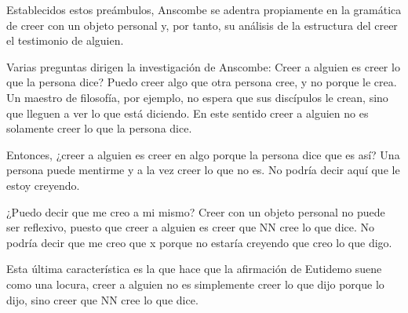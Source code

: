 Establecidos estos preámbulos, Anscombe se adentra propiamente en la gramática
de creer con un objeto personal y, por tanto, su análisis de la estructura del
creer el testimonio de alguien.

Varias preguntas dirigen la investigación de Anscombe:
Creer a alguien es creer lo que la persona dice?
Puedo creer algo que otra persona cree, y no porque le crea. Un maestro de
filosofía, por ejemplo, no espera que sus discípulos le crean, sino que lleguen
a ver lo que está diciendo. En este sentido creer a alguien no es solamente
creer lo que la persona dice.

Entonces, ¿creer a alguien es creer en algo porque la persona dice que es así?
Una persona puede mentirme y a la vez creer lo que no es. No podría decir aquí
que le estoy creyendo.

¿Puedo decir que me creo a mi mismo? Creer con un objeto personal no puede ser
reflexivo, puesto que creer a alguien es creer que NN cree lo que dice. No
podría decir que me creo que x porque no estaría creyendo que creo lo que digo.

Esta última característica es la que hace que la afirmación de Eutidemo suene
como una locura, creer a alguien no es simplemente creer lo que dijo porque lo
dijo, sino creer que NN cree lo que dice.

